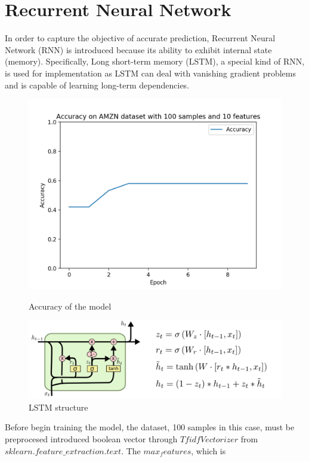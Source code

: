 \documentclass{article}
\begin{document}
\section{Recurrent Neural Network}
\indent In order to capture the objective of accurate prediction, Recurrent Neural Network (RNN) is introduced
 because its ability to exhibit internal state (memory). Specifically, Long short-term memory (LSTM),
 a special kind of RNN, is used for implementation as LSTM can deal with vanishing gradient problems
 and is capable of learning long-term dependencies.
\\
\begin{figure}
    \centering
    \includegraphics[scale=0.4]{assets/Accuracy.png}\\
    \caption{Accuracy of the model}
\end{figure}
\begin{figure}
    \centering
    \includegraphics[scale=0.4]{assets/LSTM.png}
    \caption{LSTM structure}
\end{figure}
Before begin training the model, the dataset, 100 samples in this case, must be preprocesed introduced
 boolean vector through $TfidfVectorizer$ from $sklearn.feature\_extraction.text$. The $max_features$, which is
\end{document}
